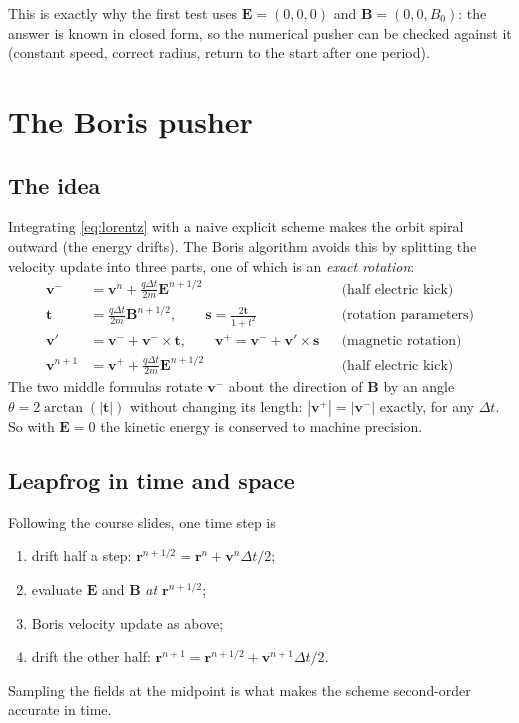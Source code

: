 \documentclass[11pt,a4paper]{article}
\newcommand{\vv}{\mathbf{v}}
\newcommand{\EE}{\mathbf{E}}
\newcommand{\BB}{\mathbf{B}}
\begin{document}
This is exactly why the first test uses $\EE=(0,0,0)$ and $\BB=(0,0,B_0)$: the answer is known
in closed form, so the numerical pusher can be checked against it (constant speed, correct
radius, return to the start after one period).

\section{The Boris pusher}
\label{sec:boris}

\subsection{The idea}
Integrating \eqref{eq:lorentz} with a naive explicit scheme makes the orbit spiral outward
(the energy drifts). The Boris algorithm avoids this by splitting the velocity update into
three parts, one of which is an \emph{exact rotation}:
\begin{align}
  \vv^- &= \vv^n + \frac{q\Delta t}{2m}\EE^{n+1/2} &&\text{(half electric kick)}\\
  \mathbf t &= \frac{q\Delta t}{2m}\BB^{n+1/2},\qquad
  \mathbf s=\frac{2\mathbf t}{1+t^2} &&\text{(rotation parameters)}\\
  \vv' &= \vv^- + \vv^-\times\mathbf t,\qquad
  \vv^+ = \vv^- + \vv'\times\mathbf s &&\text{(magnetic rotation)}\\
  \vv^{n+1} &= \vv^+ + \frac{q\Delta t}{2m}\EE^{n+1/2} &&\text{(half electric kick)}
\end{align}
The two middle formulas rotate $\vv^-$ about the direction of $\BB$ by an angle
$\theta=2\arctan(|\mathbf t|)$ without changing its length: $|\vv^+|=|\vv^-|$ exactly, for any
$\Delta t$. So with $\EE=0$ the kinetic energy is conserved to machine precision.

\subsection{Leapfrog in time and space}
Following the course slides, one time step is
\begin{enumerate}
  \item drift half a step: $\mathbf r^{n+1/2}=\mathbf r^n+\vv^n\Delta t/2$;
  \item evaluate $\EE$ and $\BB$ \emph{at $\mathbf r^{n+1/2}$};
  \item Boris velocity update as above;
  \item drift the other half: $\mathbf r^{n+1}=\mathbf r^{n+1/2}+\vv^{n+1}\Delta t/2$.
\end{enumerate}
Sampling the fields at the midpoint is what makes the scheme second-order accurate in time.
\end{document}
